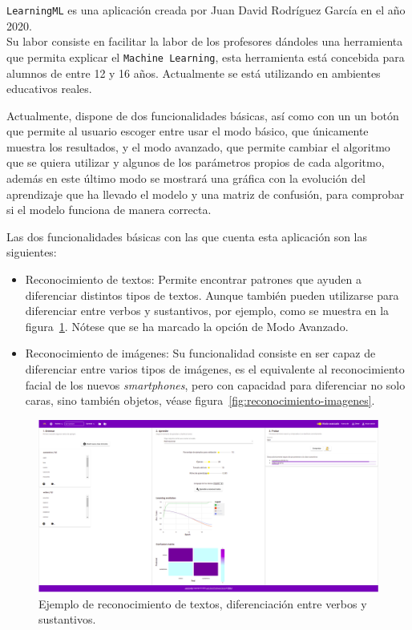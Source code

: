 \documentclass[a4paper, 12pt]{book}
\begin{document}
\texttt{LearningML} es una aplicación creada por Juan David Rodríguez García en el año 2020.\\
Su labor consiste en facilitar la labor de los profesores dándoles una herramienta que permita explicar el \texttt{Machine Learning}, esta herramienta está concebida para alumnos de entre 12 y 16 años. Actualmente se está utilizando en ambientes educativos reales.

Actualmente, dispone de dos funcionalidades básicas, así como con un un botón que permite al usuario escoger entre usar el modo básico, que únicamente muestra los resultados, y el modo avanzado, que permite cambiar el algoritmo que se quiera utilizar y algunos de los parámetros propios de cada algoritmo, además en este último modo se mostrará una gráfica con la evolución del aprendizaje que ha llevado el modelo y una matriz de confusión, para comprobar si el modelo funciona de manera correcta.

Las dos funcionalidades básicas con las que cuenta esta aplicación son las siguientes:

\begin{itemize}
	\item Reconocimiento de textos: Permite encontrar patrones que ayuden a diferenciar distintos tipos de textos. Aunque también pueden utilizarse para diferenciar entre verbos y sustantivos, por ejemplo, como se muestra en la figura~\ref{fig:reconocimiento-textos}. Nótese que se ha marcado la opción de Modo Avanzado.
	\item Reconocimiento de imágenes: Su funcionalidad consiste en ser capaz de diferenciar entre varios tipos de imágenes, es el equivalente al reconocimiento facial de los nuevos \textit{smartphones}, pero con capacidad para diferenciar no solo caras, sino también objetos, véase figura~\ref{fig:reconocimiento-imagenes}.
\end{itemize}

\begin{figure}
	\centering
	\includegraphics[width=12cm, keepaspectratio]{img/reconocimiento-textos.png}
	\caption{Ejemplo de reconocimiento de textos, diferenciación entre verbos y sustantivos.}\label{fig:reconocimiento-textos}
\end{figure}
\end{document}
